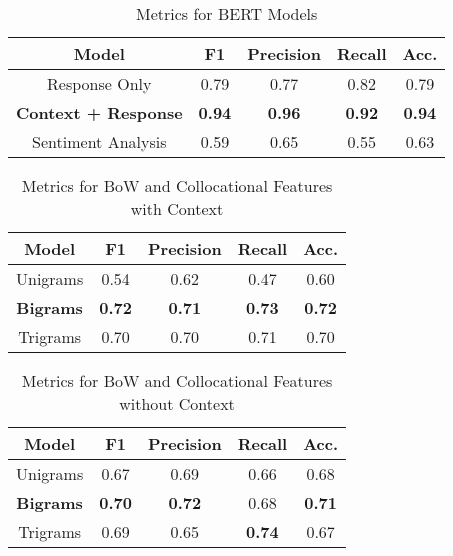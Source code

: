 \documentclass[11pt,a4paper]{article}
\begin{document}
\begin{center}
  \tabcolsep=0.03cm
  \begin{table}[H]
  \begin{tabular}{||c c c c c||} 
   \hline
   Model & F1 & Precision & Recall & Acc. \\ [0.5ex] 
   \hline\hline
   Response Only & 0.79 & 0.77 & 0.82 & 0.79 \\ 
   \hline
   \textbf{Context + Response} & \textbf{ 0.94 } & \textbf{ 0.96 } & \textbf{ 0.92 } & \textbf{ 0.94 } \\ 
   \hline
   Sentiment Analysis & 0.59 & 0.65 & 0.55 & 0.63 \\ [0.5ex] 
   \hline
  \end{tabular}
  \caption{Metrics for BERT Models}  
   \label{table:bertMetrics}
  \end{table}
  \tabcolsep=0.22cm
  \begin{table}[H]
  \begin{tabular}{||c c c c c||} 
   \hline
   Model & F1 & Precision & Recall & Acc. \\ [0.5ex] 
   \hline\hline
   Unigrams & 0.54 & 0.62 & 0.47 & 0.60 \\ 
   \hline
   \textbf{Bigrams}  & \textbf{ 0.72 } &   \textbf{0.71} & \textbf{0.73} & \textbf{0.72} \\ 
   \hline
   Trigrams & 0.70 & 0.70 & 0.71 & 0.70 \\ [0.5ex] 
   \hline
  \end{tabular}
  \caption{Metrics for BoW and Collocational Features with Context}  
   \label{table:bowContext}
  \end{table}
  \tabcolsep=0.22cm
  \begin{table}[H]
  \begin{tabular}{||c c c c c||} 
   \hline
   Model & F1 & Precision & Recall & Acc. \\ [0.5ex] 
   \hline\hline
   Unigrams & 0.67 & 0.69 & 0.66 & 0.68 \\ 
   \hline
   \textbf{Bigrams}  & \textbf{ 0.70 } &   \textbf{0.72} & 0.68 & \textbf{0.71} \\ 
   \hline
   Trigrams & 0.69 & 0.65 & \textbf{ 0.74 } & 0.67 \\ [0.5ex] 
   \hline
  \end{tabular}
  \caption{Metrics for BoW and Collocational Features without Context}  
   \label{table:bowNoContext}
  \end{table}
  \end{center}
\end{document}
